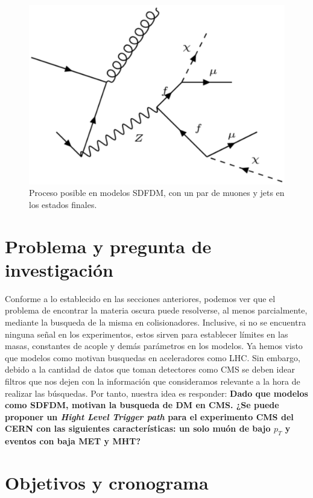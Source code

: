 \begin{figure}
 	\centering
 	\includegraphics[width=13cm]{F6.png}
 	\caption{\label{fig:frog} Proceso posible en modelos SDFDM, con un par de muones y jets en los estados finales.}
\end{figure}

\newpage
\section{Problema y pregunta de investigación}

	Conforme a lo establecido en las secciones anteriores, podemos ver que el problema de encontrar la materia oscura puede resolverse, al menos parcialmente, mediante la busqueda de la misma en colisionadores. Inclusive, si no se encuentra ninguna señal en los experimentos, estos sirven para establecer límites en las masas, constantes de acople y demás parámetros en los modelos. Ya hemos visto que modelos como \cite{1475-7516-2016-03-048} motivan busquedas en aceleradores como LHC. Sin embargo, debido a la cantidad de datos que toman detectores como CMS se deben idear filtros que nos dejen con la información que consideramos relevante a la hora de realizar las búsquedas. Por tanto, nuestra idea es responder: \textbf{Dado que modelos como SDFDM, motivan la busqueda de DM en CMS. ¿Se puede proponer un \textit{Hight Level Trigger path} para el experimento CMS del CERN con las siguientes características: un solo muón de bajo $p_T$ y eventos con baja MET y MHT?}


\newpage
\section{Objetivos y cronograma}


